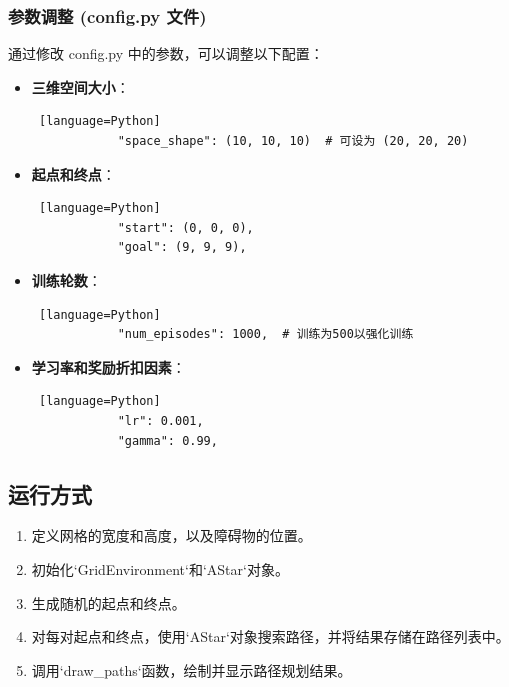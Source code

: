 \documentclass[lettersize,journal]{IEEEtran}
\begin{document}
	
	\subsubsection{ 参数调整 (config.py 文件)}  
	通过修改 config.py 中的参数，可以调整以下配置：  
	\begin{itemize}  
		\item \textbf{三维空间大小}：  
		\begin{lstlisting} [language=Python]  
			"space_shape": (10, 10, 10)  # 可设为 (20, 20, 20)  
		\end{lstlisting}  
		\item \textbf{起点和终点}：  
		\begin{lstlisting} [language=Python]  
			"start": (0, 0, 0),  
			"goal": (9, 9, 9),  
		\end{lstlisting}  
		\item \textbf{训练轮数}：  
		\begin{lstlisting} [language=Python]  
			"num_episodes": 1000,  # 训练为500以强化训练  
		\end{lstlisting}  
		\item \textbf{学习率和奖励折扣因素}：  
		\begin{lstlisting} [language=Python]  
			"lr": 0.001,  
			"gamma": 0.99,  
		\end{lstlisting}  
	\end{itemize}  
	
	\subsection{运行方式}
	\begin{enumerate}
		\item 定义网格的宽度和高度，以及障碍物的位置。
		\item 初始化`GridEnvironment`和`AStar`对象。
		\item 生成随机的起点和终点。
		\item 对每对起点和终点，使用`AStar`对象搜索路径，并将结果存储在路径列表中。
		\item 调用`draw\_paths`函数，绘制并显示路径规划结果。
	\end{enumerate}
	
\end{document}
